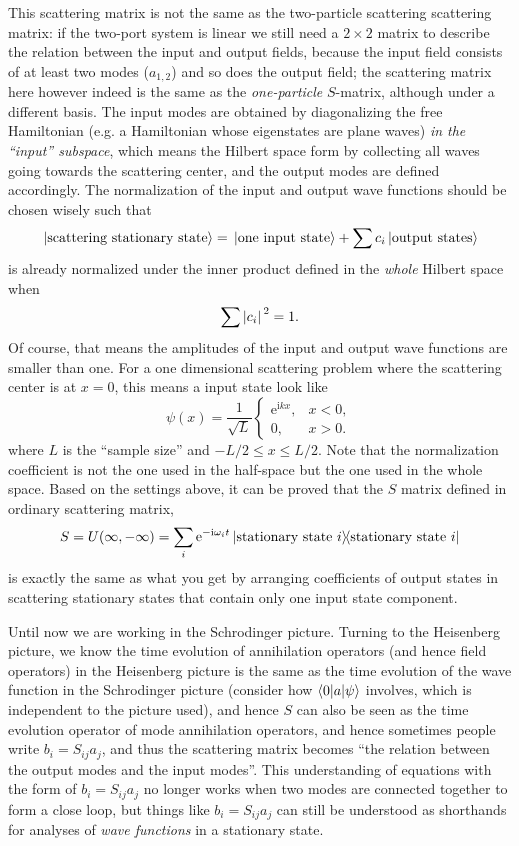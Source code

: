 \documentclass[hyperref, a4paper]{article}
\newcommand*{\ii}{\mathrm{i}}
\newcommand*{\ee}{\mathrm{e}}
\begin{document}
This scattering matrix is not the same as 
the two-particle scattering scattering matrix:
if the two-port system is linear we still need a $2\times 2$ matrix 
to describe the relation between the input and output fields, 
because the input field consists of at least two modes ($a_{1, 2}$)
and so does the output field; 
the scattering matrix here however indeed is the same as the \emph{one-particle} $S$-matrix, 
although under a different basis.
The input modes are obtained by diagonalizing the free Hamiltonian 
(e.g. a Hamiltonian whose eigenstates are plane waves)
\emph{in the ``input'' subspace}, 
which means the Hilbert space form by collecting all waves going towards the scattering center, 
and the output modes are defined accordingly.
The normalization of the input and output wave functions should be chosen wisely such that  
\begin{equation}
    \ket*{\text{scattering stationary state}} = \ket*{\text{one input state}} + \sum c_i \ket*{\text{output states}}
\end{equation}
is already normalized under the inner product defined in the \emph{whole} Hilbert space when 
\begin{equation}
    \sum \abs*{c_i}^2 = 1.
\end{equation}
Of course, that means the amplitudes of the input and output wave functions are smaller than one.
For a one dimensional scattering problem where the scattering center is at $x=0$, 
this means a input state look like 
\begin{equation}
    \psi(x) = \frac{1}{\sqrt{L}} \begin{cases}
        \ee^{\ii k x} , & x < 0, \\
        0, & x > 0.
    \end{cases}
\end{equation}
where $L$ is the ``sample size'' and $- L/2 \leq x \leq L/2$.
Note that the normalization coefficient is not the one used in the half-space 
but the one used in the whole space.
Based on the settings above, 
it can be proved that the $S$ matrix defined in ordinary scattering matrix,
\[
    S = U(\infty, -\infty) = \sum_i \ee^{- \ii \omega_i t} \dyad{\text{stationary state $i$}}
\]
is exactly the same as what you get by arranging coefficients of output states  
in scattering stationary states that contain only one input state component. 

Until now we are working in the Schrodinger picture.
Turning to the Heisenberg picture, 
we know the time evolution of annihilation operators (and hence field operators) in the Heisenberg picture
is the same as the time evolution of the wave function in the Schrodinger picture 
(consider how $\mel**{0}{a}{\psi}$ involves, which is independent to the picture used),
and hence $S$ can also be seen as the time evolution operator of mode annihilation operators, 
and hence sometimes people write $b_i = S_{ij} a_j$, 
and thus the scattering matrix becomes ``the relation between the output modes and the input modes''.
This understanding of equations with the form of $b_i = S_{ij} a_j$
no longer works when two modes are connected together to form a close loop, 
but things like $b_i = S_{ij} a_j$ can still be understood 
as shorthands for analyses of \emph{wave functions} in a stationary state.
\end{document}
